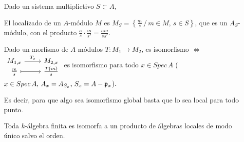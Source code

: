 Dado un sistema multiplictivo $S \subset A$,
\begin{defi}
    El localizado de un $A$-m\'odulo $M$ es $M_S=\left\{ \frac{m}{s} \, / \, m \in M, \, s\in S \right\}$, que es un $A_S$-m\'odulo, con el producto $\frac{a}{s} \cdot \frac{m}{s'} = \frac{am}{ss'}$.
\end{defi}
\begin{obs}
    
Dado un morfismo de $A$-m\'odulos $T: M_1 \longrightarrow M_2$, es isomorfismo $\iff$ $\bt M_{1,x} \rar{T_x} & M_{2,x} \\[-8mm] \frac{m}{s} \rarmaps & \frac{T(m)}{s} \et $ es isomorfismo para todo $x \in Spec\, A$ ($x\in Spec\, A, \, A_x = A_{S_x}, \, S_x = A-\mathfrak{p}_x$). 

Es decir, para que algo sea isomorfismo global basta que lo sea local para todo punto.
\end{obs}
\begin{teo}
    Toda $k$-\'algebra finita es isomorfa a un producto de \'algebras locales de modo \'unico salvo el orden.
\end{teo}
